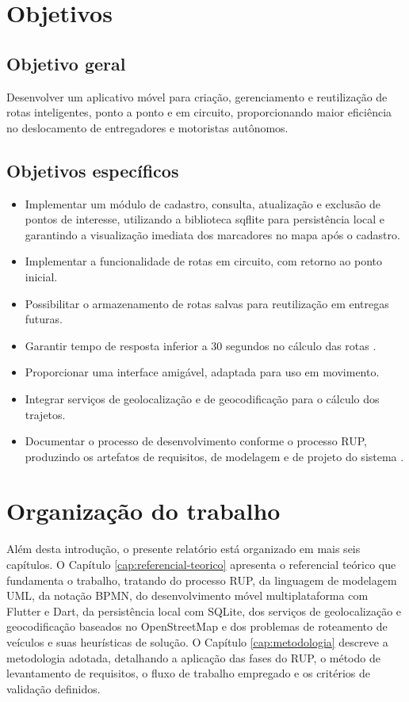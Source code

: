 \section{Objetivos}

\subsection{Objetivo geral}

Desenvolver um aplicativo móvel para criação, gerenciamento e reutilização de rotas inteligentes, ponto a ponto e em circuito, proporcionando maior eficiência no deslocamento de entregadores e motoristas autônomos.

\subsection{Objetivos específicos}

\begin{itemize}
    \item Implementar um módulo de cadastro, consulta, atualização e exclusão de pontos de interesse, utilizando a biblioteca sqflite para persistência local e garantindo a visualização imediata dos marcadores no mapa após o cadastro.
    \item Implementar a funcionalidade de rotas em circuito, com retorno ao ponto inicial.
    \item Possibilitar o armazenamento de rotas salvas para reutilização em entregas futuras.
    \item Garantir tempo de resposta inferior a 30 segundos no cálculo das rotas \cite{sriEspecComp2025}.
    \item Proporcionar uma interface amigável, adaptada para uso em movimento.
    \item Integrar serviços de geolocalização e de geocodificação para o cálculo dos trajetos.
    \item Documentar o processo de desenvolvimento conforme o processo RUP, produzindo os artefatos de requisitos, de modelagem e de projeto do sistema \cite{sriEspecComp2025}.
\end{itemize}

\section{Organização do trabalho}

Além desta introdução, o presente relatório está organizado em mais seis capítulos. O Capítulo \ref{cap:referencial-teorico} apresenta o referencial teórico que fundamenta o trabalho, tratando do processo RUP, da linguagem de modelagem UML, da notação BPMN, do desenvolvimento móvel multiplataforma com Flutter e Dart, da persistência local com SQLite, dos serviços de geolocalização e geocodificação baseados no OpenStreetMap e dos problemas de roteamento de veículos e suas heurísticas de solução. O Capítulo \ref{cap:metodologia} descreve a metodologia adotada, detalhando a aplicação das fases do RUP, o método de levantamento de requisitos, o fluxo de trabalho empregado e os critérios de validação definidos.

